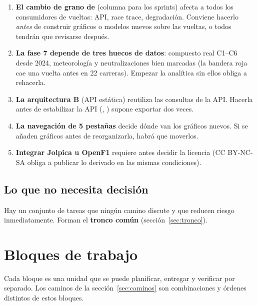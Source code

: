 \documentclass[11pt,openany]{report}
\begin{document}
\begin{enumerate}
  \item \textbf{El cambio de grano de } (columna  para los
  sprints) afecta a todos los consumidores de vueltas: API, race trace, degradación. Conviene
  hacerlo \emph{antes} de construir gráficos o modelos nuevos sobre las vueltas, o todos tendrán que
  revisarse después.
  \item \textbf{La fase 7 depende de tres huecos de datos}: compuesto real C1–C6 desde 2024,
  meteorología y neutralizaciones bien marcadas (la bandera roja cae una vuelta antes en 22
  carreras). Empezar la analítica sin ellos obliga a rehacerla.
  \item \textbf{La arquitectura B} (API estática) reutiliza las consultas de la API. Hacerla antes
  de estabilizar la API (, ) supone exportar dos veces.
  \item \textbf{La navegación de 5 pestañas} decide dónde van los gráficos nuevos. Si se añaden
  gráficos antes de reorganizarla, habrá que moverlos.
  \item \textbf{Integrar Jolpica u OpenF1} requiere antes decidir la licencia (CC BY-NC-SA obliga a
  publicar lo derivado en las mismas condiciones).
\end{enumerate}

\subsection*{Lo que no necesita decisión}

Hay un conjunto de tareas que ningún camino discute y que reducen riesgo inmediatamente. Forman el
\textbf{tronco común} (sección~\ref{sec:tronco}).

\section{Bloques de trabajo}

Cada bloque es una unidad que se puede planificar, entregar y verificar por separado. Los caminos
de la sección~\ref{sec:caminos} son combinaciones y órdenes distintos de estos bloques.
\end{document}
